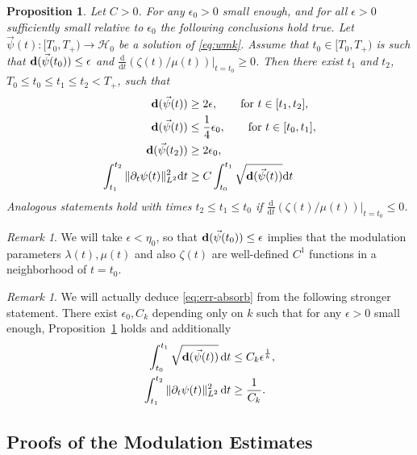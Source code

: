 \documentclass[10pt,reqno]{amsart}
\newcommand{\HH}{\mathcal{H}}
\numberwithin{equation}{section}
\newtheorem{prop}[thm]{Proposition}
\theoremstyle{remark}
\newtheorem{rem}[thm]{Remark}
\newcommand{\dd}[1]{\frac{\ud}{\ud{#1}}}
\newcommand{\ud}{\mathrm{d}}
\newcommand{\0}{\emptyset}
\newcommand{\eps}{\epsilon}
\newcommand{\bfd}{{\bf d}}
\begin{document}
\begin{prop}
\label{prop:modulation}
Let $C > 0$. For any $\eps_0>0$ small enough, and for all $\eps>0$ sufficiently small relative to $\eps_0$ the following conclusions hold true.   %
Let $\vec\psi(t): [T_0, T_+) \to \HH_0$ be a solution of \eqref{eq:wmk}. 
Assume that $t_0 \in [T_0, T_+)$ is such that $\bfd(\vec \psi(t_0)) \leq \eps$
and $\dd t(\zeta(t)/\mu(t))\vert_{t = t_0} \geq 0$.
Then there exist $t_1$ and $t_2$, $T_0 \leq t_0 \leq t_1 \leq t_2 < T_+$,
such that
\begin{align}
\bfd(\vec \psi(t)) &\geq 2\eps,\qquad \text{for }t \in [t_1, t_2], \label{eq:d-t1-t2}\\
\bfd(\vec \psi(t)) &\leq \frac 14\eps_0,\qquad \text{for }t \in [t_0, t_1], \label{eq:d-t0-t1}\\
\bfd(\vec \psi(t_2)) &\geq 2\eps_0, \label{eq:d-at-t2} \\
\int_{t_1}^{t_2} \|\partial_t\psi(t)\|_{L^2}^2\ud t &\geq C\int_{t_0}^{t_1}\sqrt{\bfd(\vec \psi(t))}\ud t
\label{eq:err-absorb}
\end{align}
Analogous statements hold with times  $t_2  \le  t_1 \le t_0$ if $\dd t(\zeta(t)/\mu(t))\vert_{t = t_0} \le 0$. 
\end{prop}
\begin{rem}
We will take $\eps < \eta_0$, so that $\bfd(\vec\psi(t_0)) \leq \eps$
implies that the modulation parameters $\lambda(t), \mu(t)$ and also $\zeta(t)$ are well-defined $C^1$ functions in a neighborhood of $t= t_0$.

\end{rem}
\begin{rem}
We will actually deduce \eqref{eq:err-absorb} from the following stronger statement.
There exist $\eps_0, C_k$ depending only on $k$ such that
for any $\eps > 0$ small enough, Proposition~\ref{prop:modulation} holds and additionally
\begin{align}
\int_{t_0}^{t_1}\sqrt{\bfd(\vec\psi(t))}\,\ud t &\leq C_k \eps^{\frac 1k}, \label{eq:uni-borne} \\
\int_{t_1}^{t_2}\|\partial_t \psi(t)\|_{L^2}^2\,\ud t &\geq \frac{1}{C_k}.
\end{align}
\end{rem}




\subsection{Proofs of the Modulation Estimates}  \label{s:modproof} %
\end{document}
